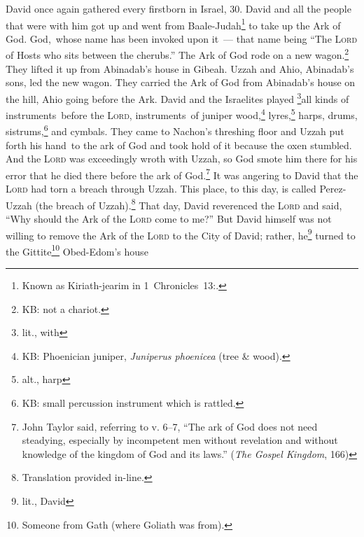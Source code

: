 
\begin{inparaenum}
     David once again gathered every firstborn in Israel, 30.%
     David and all the people that were with him got up and went from Baale-Judah\footnote{Known as Kiriath-jearim in 1~Chronicles~13\thinspace:.} to take up the Ark of God. God,\understood\ whose name has been invoked upon it~--- that name being ``The \textsc{Lord} of Hosts who sits between the cherubs.''%
     The Ark of God rode on a new wagon.\footnote{KB: not a chariot.} They lifted it up from Abinadab's house in Gibeah. Uzzah and Ahio, Abinadab's sons, led the new wagon.%
     They carried the Ark of God from Abinadab's house on the hill, Ahio going before the Ark.%
     David and the Israelites played \footnote{lit., with}all kinds of instruments\understood\ before the \textsc{Lord}, instruments\understood\ of juniper wood,\footnote{KB: Phoenician juniper, \textit{Juniperus phoenicea} (tree \& wood).} lyres,\footnote{alt., harp} harps, drums, sistrums,\footnote{KB: small percussion instrument which is rattled.} and cymbals.%
     They came to Nachon's threshing floor and Uzzah put forth his hand\understood\ to the ark of God and took hold of it because the oxen stumbled.%
     And the \textsc{Lord} was exceedingly wroth with Uzzah, so God smote him there for his error that he died there before the ark of God.\footnote{John Taylor said, referring to v. 6--7, ``The ark of God does not need steadying, especially by incompetent men without revelation and without knowledge of the kingdom of God and its laws.'' (\textit{The Gospel Kingdom}, 166)}%
     It was angering to David that the \textsc{Lord} had torn a breach through Uzzah. This place, to this day, is called Perez-Uzzah (the breach of Uzzah).\footnote{Translation provided in-line.}%
     That day, David reverenced the \textsc{Lord} and said, ``Why should the Ark of the \textsc{Lord} come to me?''%
     But David himself was not willing to remove the Ark of the \textsc{Lord} to the City of David; rather, he\footnote{lit., David} turned to the Gittite\footnote{Someone from Gath (where Goliath was from).} Obed-Edom's house%

\end{inparaenum}
